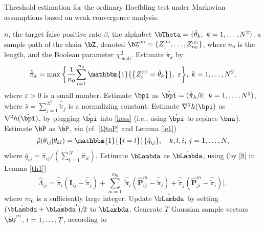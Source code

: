 \documentclass[10pt, twocolumn]{IEEEtran}
\begin{document}
\begin{algorithm}
	\caption{Threshold estimation for the ordinary Hoeffding test
          under Markovian assumptions based on weak convergence analysis.}
	\label{alg:thres}
	\begin{algorithmic}[1]
           $n$, the target false
          positive rate $\beta$, the alphabet ${\bTheta} = \{
          {{{\tilde {\theta}}_k}}; ~k = 1, \ldots, N^2 \}$,
          a sample path of the chain $\bZ$, denoted
          ${\bZ^{\scriptscriptstyle{( 0 )}}} = \{
          {Z_1^{\scriptscriptstyle{( 0 )}}, \ldots
            ,Z_{n_0}^{\scriptscriptstyle{( 0 )}}} \}$, where $n_0$
          is the length, {and the Boolean parameter $\chi^2_\text{enab}$}.
\STATE Estimate $ {{{\tilde {\pi}}_k}}$ by
\[ 
{{\hat {\tilde {\pi}} }_k} = \max \bigg\{
		{\frac{1}{n_0}{\sum\limits_{i = 1}^{{n_0}} {\mathbbm{1}{\big\{
	{Z_i^{\scriptscriptstyle{( 0 )}} = {{{\tilde {\theta}}_k}}} \big\}}}
			}, ~\varepsilon } \bigg\},\; k=1,\ldots,N^2,
\]
where $\varepsilon > 0$ is a small number.  
\STATE Estimate ${\bpi}$ as
$\hat {{\bpi}} = ( {{{{{\hat{ \tilde {\pi}} }_k}}} \mathord{/
    {\vphantom {1 2}} \kern-\nulldelimiterspace} {{\hat s}}}; ~k = 1,
\ldots, N^2 )$, where $\hat s = \sum_{j = 1}^{{N^2}}
{{{\hat {\tilde{ \pi }}}_j}} $ is a normalizing constant.  
\STATE Estimate ${\nabla ^2}h( {\bpi} )$ as ${\nabla
  ^2}h( \hat {{\bpi}} )$, by plugging $\hat {{\bpi}}$ into \eqref{hess}
(i.e., using $\hat {{\bpi}}$ to replace ${\bnu}$).  
\STATE Estimate
$\bP$ as $\hat {\bP}$, via (cf. \eqref{QtoP} and Lemma \ref{le1})
\[
{\hat p}( {{\theta_{ij}}| {{\theta_{kl}}} } ) =
\mathbbm{1}{\{ {i = l} \}}{{\hat q}_{ij}}, \quad k,l,i,\,j = 1, \ldots ,N, 
\]
where 
$ {\hat q}_{ij} = {\hat \pi}_{ij}/(\sum_{t = 1}^N {\hat \pi }_{it})$.
\STATE Estimate $\bLambda$ as $\hat {\bLambda}$, using (by \eqref{8} in
Lemma \ref{th1}) 
\[
{{\hat \Lambda }_{ij}} = {{\hat {\tilde \pi} }_i} ( {{{\mathbf{I}}_{ij}} - {{\hat {\tilde \pi }}_j}} ) + \sum\limits_{m = 1}^{{m_0}} \Big[{{\hat {\tilde \pi }}_i}( {\hat {\mathbf{P}}_{ij}^m - {{\hat {\tilde \pi} }_j}} ) 
+ {{\hat {\tilde \pi} }_j}( {\hat {\mathbf{P}}_{ji}^m - {{\hat {\tilde
        \pi} }_i}} )\Big], 
\]
where $m_0$ is a sufficiently large integer.	
\STATE Update  $\hat {\bLambda}$ by setting ${(\hat{\bLambda} +
\hat{\bLambda}^{\prime}) \mathord{/ {\vphantom {1 2}} 
\kern-\nulldelimiterspace} 2}$ to $\hat {\bLambda}$.
{
\STATE Generate $T$ Gaussian sample vectors ${\hat
  {\bU}}^{\scriptscriptstyle{(t)}}, \,t=1,\ldots,T$, according to
}
\end{algorithmic}
\end{algorithm}
\end{document}
